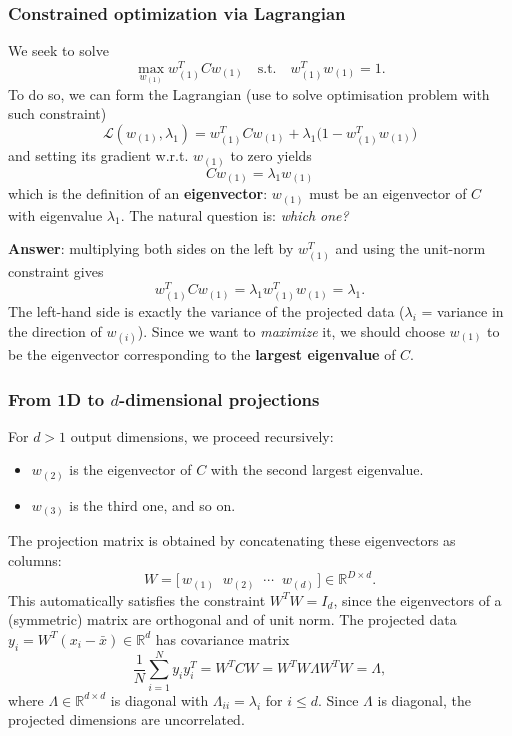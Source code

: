 \subsubsection{Constrained optimization via Lagrangian}
We seek to solve
\[
\max_{w_{(1)}} w_{(1)}^T C w_{(1)} \quad \text{s.t.} \quad w_{(1)}^T w_{(1)} = 1.
\]
To do so, we can form the Lagrangian (use to solve optimisation problem with such constraint)
\[
\mathcal{L}(w_{(1)}, \lambda_1) = w_{(1)}^T C w_{(1)} + \lambda_1 \bigl(1 - w_{(1)}^T w_{(1)}\bigr)
\]
and setting its gradient w.r.t. $w_{(1)}$ to zero yields
\[
\boxed{\, C w_{(1)} = \lambda_1 w_{(1)} \,}
\]
which is the definition of an \textbf{eigenvector}: $w_{(1)}$ must be an eigenvector of $C$
with eigenvalue $\lambda_1$. The natural question is: \emph{which one?}

\textbf{Answer}: multiplying both sides on the left by $w_{(1)}^T$ and using the unit-norm
constraint gives
\[
w_{(1)}^T C w_{(1)} = \lambda_1 w_{(1)}^T w_{(1)} = \lambda_1.
\]
The left-hand side is exactly the variance of the projected data ($\lambda_i$ = variance in the direction of $w_{(i)}$). Since we want to
\emph{maximize} it, we should choose $w_{(1)}$ to be the eigenvector corresponding to the
\textbf{largest eigenvalue} of $C$.

\subsubsection{From 1D to $d$-dimensional projections}
For $d > 1$ output dimensions, we proceed recursively:
\begin{itemize}
  \item $w_{(2)}$ is the eigenvector of $C$ with the second largest eigenvalue.
  \item $w_{(3)}$ is the third one, and so on.
\end{itemize}
The projection matrix is obtained by concatenating these eigenvectors as columns:
\[
W = \bigl[\, w_{(1)} \;\; w_{(2)} \;\; \cdots \;\; w_{(d)} \,\bigr] \in \mathbb{R}^{D \times d}.
\]
This automatically satisfies the constraint $W^T W = I_d$, since the eigenvectors of a
(symmetric) matrix are orthogonal and of unit norm.  The projected data $y_i = W^T(x_i - \bar{x}) \in \mathbb{R}^d$
has covariance matrix
\[
\frac{1}{N}\sum_{i=1}^N y_i y_i^T = W^T C W = W^T W \Lambda W^T W = \Lambda,
\]
where $\Lambda \in \mathbb{R}^{d \times d}$ is diagonal with $\Lambda_{ii} = \lambda_i$ for $i \leq d$.
Since $\Lambda$ is diagonal, the projected dimensions are uncorrelated.
